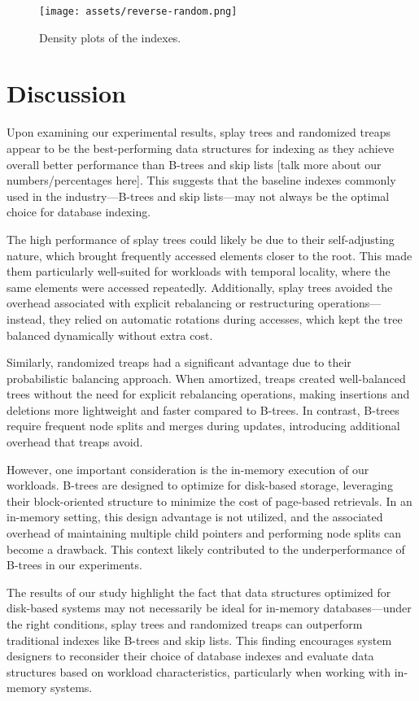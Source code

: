 \documentclass[sigconf]{acmart}
\begin{document}
\begin{center}
  \begin{figure}[H]
    \texttt{[image: assets/reverse-random.png]}
    \caption{Density plots of the indexes.}
  \end{figure}
\end{center}
\newpage

\section{Discussion}
Upon examining our experimental results, splay trees and randomized treaps appear to be the best-performing data structures for indexing as they achieve overall better performance than B-trees and skip lists [talk more about our numbers/percentages here]. This suggests that the baseline indexes commonly used in the industry---B-trees and skip lists---may not always be the optimal choice for database indexing.

The high performance of splay trees could likely be due to their self-adjusting nature, which brought frequently accessed elements closer to the root. This made them particularly well-suited for workloads with temporal locality, where the same elements were accessed repeatedly. Additionally, splay trees avoided the overhead associated with explicit rebalancing or restructuring operations---instead, they relied on automatic rotations during accesses, which kept the tree balanced dynamically without extra cost.

Similarly, randomized treaps had a significant advantage due to their probabilistic balancing approach. When amortized, treaps created well-balanced trees without the need for explicit rebalancing operations, making insertions and deletions more lightweight and faster compared to B-trees. In contrast, B-trees require frequent node splits and merges during updates, introducing additional overhead that treaps avoid.

However, one important consideration is the in-memory execution of our workloads. B-trees are designed to optimize for disk-based storage, leveraging their block-oriented structure to minimize the cost of page-based retrievals. In an in-memory setting, this design advantage is not utilized, and the associated overhead of maintaining multiple child pointers and performing node splits can become a drawback. This context likely contributed to the underperformance of B-trees in our experiments.

The results of our study highlight the fact that data structures optimized for disk-based systems may not necessarily be ideal for in-memory databases---under the right conditions, splay trees and randomized treaps can outperform traditional indexes like B-trees and skip lists. This finding encourages system designers to reconsider their choice of database indexes and evaluate data structures based on workload characteristics, particularly when working with in-memory systems.
\end{document}
